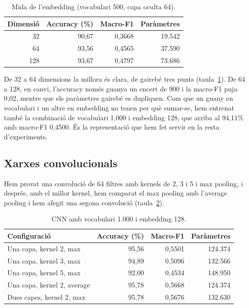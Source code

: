 \documentclass[11pt,a4paper]{article}
\begin{document}
\begin{table}[ht]
\centering\small
\caption{Mida de l'embedding (vocabulari 500, capa oculta 64).}
\label{tab:emb}
\begin{tabular}{rrrr}
\toprule
Dimensió & Accuracy (\%) & Macro-F1 & Paràmetres\\
\midrule
32 & 90,67 & 0,3668 & 19.542 \\
64 & 93,56 & 0,4565 & 37.590 \\
128 & 93,67 & 0,4797 & 73.686 \\
\bottomrule
\end{tabular}
\end{table}

De 32 a 64 dimensions la millora és clara, de gairebé tres punts (taula~\ref{tab:emb}). De 64 a 128, en canvi,
l'accuracy només guanya un encert de 900 i la macro-F1 puja 0,02, mentre que els paràmetres gairebé es dupliquen.
Com que un guany en vocabulari i un altre en embedding no tenen per què sumar-se, hem entrenat també la combinació
de vocabulari 1.000 i embedding 128, que arriba al 94,11\% amb macro-F1 0,4500. És la representació que hem fet
servir en la resta d'experiments.

\subsection{Xarxes convolucionals}
\label{sec:cnn}

Hem provat una convolució de 64 filtres amb kernels de 2, 3 i 5 i max pooling, i després, amb el millor kernel,
hem comparat el max pooling amb l'average pooling i hem afegit una segona convolució (taula~\ref{tab:cnn}).

\begin{table}[ht]
\centering\small
\caption{CNN amb vocabulari 1.000 i embedding 128.}
\label{tab:cnn}
\begin{tabular}{lrrr}
\toprule
Configuració & Accuracy (\%) & Macro-F1 & Paràmetres\\
\midrule
Una capa, kernel 2, max & 95,56 & 0,5501 & 124.374 \\
Una capa, kernel 3, max & 94,89 & 0,5096 & 132.566 \\
Una capa, kernel 5, max & 92,00 & 0,4534 & 148.950 \\
Una capa, kernel 2, average & 95,78 & 0,5668 & 124.374 \\
Dues capes, kernel 2, max & 95,78 & 0,5676 & 132.630 \\
\bottomrule
\end{tabular}
\end{table}
\end{document}
